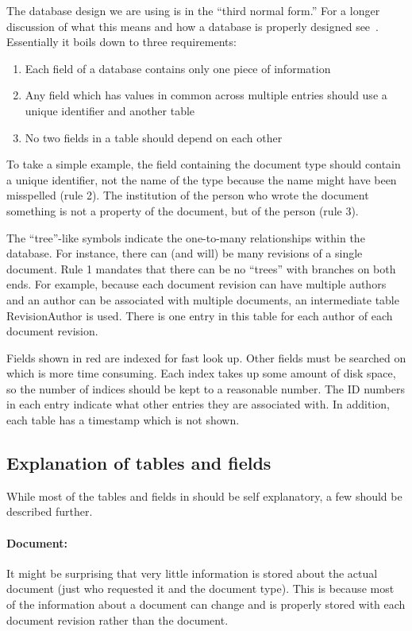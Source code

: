 \documentclass[12pt]{article}
\begin{document}
The database design we are using is in the ``third normal form.'' For a longer
discussion of what this means and how a database is properly designed
see~\cite{YargerReeseKing:1999}. Essentially it boils down to three requirements:
\begin{enumerate}
\item{Each field of a database contains only one piece of information}
\item{Any field which has values in common across multiple entries should use a
unique identifier and another table}
\item{No two fields in a table should depend on each other}
\end{enumerate}
To take a simple example, the field containing the document type should contain
a unique identifier, not the name of the type because the name might have been
misspelled (rule 2). The institution of the person who wrote the document
something is not a property of the document, but of the person (rule 3).

The ``tree''-like symbols indicate the one-to-many relationships within the
database. For instance, there can (and will) be many revisions of a  single
document.  Rule 1 mandates that there can be no ``trees'' with branches on both
ends. For example, because each document revision can have multiple authors and
an author can be associated with multiple documents, an intermediate table
RevisionAuthor is used. There is one entry in this table for each author of
each document revision.

Fields shown in red are indexed for fast look up. Other fields must be searched
on which is more time consuming. Each index takes up some  amount of disk
space, so the number of indices should be kept to a reasonable number. The ID
numbers in each entry indicate what other entries they are associated with. In
addition, each table has a timestamp which is not shown.

\subsection{Explanation of tables and fields}

While most of the tables and fields in  should be self
explanatory, a few should be described further.

\paragraph{Document:} It might be surprising that very little information is
stored about the actual document (just who requested it and the document type).
This is because most of the information about a document can change and is
properly stored with each document revision rather than the document.
\end{document}
